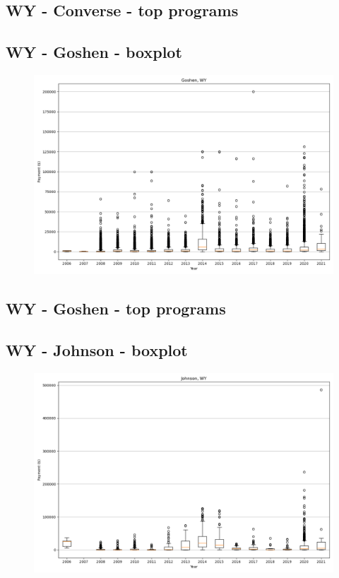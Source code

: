 \subsection*{WY - Converse - top programs}

\newpage
\subsection*{WY - Goshen - boxplot}
\begin{figure}[h]
\centering
\includegraphics[width=7in]{../output/boxplots/counties/Goshen-WY_boxplot.png}
\end{figure}


\subsection*{WY - Goshen - top programs}

\newpage
\subsection*{WY - Johnson - boxplot}
\begin{figure}[h]
\centering
\includegraphics[width=7in]{../output/boxplots/counties/Johnson-WY_boxplot.png}
\end{figure}


